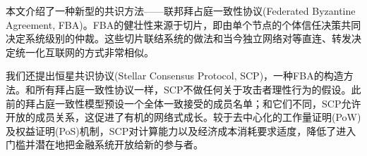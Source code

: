 \abstract{}
本文介绍了一种新型的共识方法——联邦拜占庭一致性协议(Federated Byzantine Agreement, FBA)。FBA的健壮性来源于{\quorum}切片，即由单个节点的个体信任决策共同决定系统级别的仲裁。这些切片联结系统的做法和当今独立网络对等直连、转发决定统一化互联网的方式非常相似。

我们还提出恒星共识协议(Stellar Consensus Protocol, SCP)，一种FBA的构造方法。和所有拜占庭一致性协议一样，SCP不做任何关于攻击者理性行为的假设。此前的拜占庭一致性模型预设一个全体一致接受的成员名单；和它们不同，SCP允许开放的成员关系，这促进了有机的网络式成长。较于去中心化的工作量证明(PoW)及权益证明(PoS)机制，SCP对计算能力以及经济成本消耗要求适度，降低了进入门槛并潜在地把金融系统开放给新的参与者。
